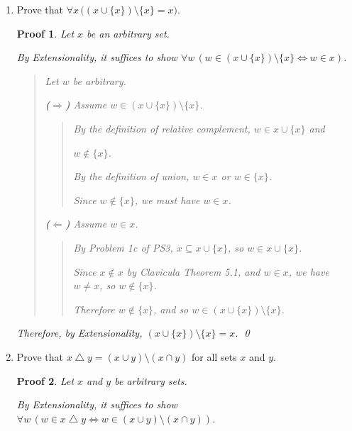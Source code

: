 \documentclass[12pt]{article}
\theoremstyle{proofstyle}
\newtheorem*{proof*}{Proof}
\begin{document}
\begin{enumerate}[left=0pt, itemsep=2em, parsep=1em]
\begin{enumerate}[label=(\alph*), itemsep=1.5em, leftmargin=2em]

\item Prove that $\forall x\,\bigl((x \cup \{x\}) \setminus \{x\} = x\bigr)$.

\begin{proof*}
    Let $x$ be an arbitrary set.

    By Extensionality, it suffices to show $\forall w\,(w \in (x \cup \{x\}) \setminus \{x\} \Leftrightarrow w \in x)$.

    \begin{quote}
        Let $w$ be arbitrary.

        \textbf{($\Rightarrow$)} Assume $w \in (x \cup \{x\}) \setminus \{x\}$.

        \begin{quote}
            By the definition of relative complement, $w \in x \cup \{x\}$ and 
            
            $w \notin \{x\}$.

            By the definition of union, $w \in x$ or $w \in \{x\}$.

            Since $w \notin \{x\}$, we must have $w \in x$.
        \end{quote}

        \textbf{($\Leftarrow$)} Assume $w \in x$.

        \begin{quote}
            By Problem 1c of PS3, $x \subseteq x \cup \{x\}$, so $w \in x \cup \{x\}$.

            Since $x \notin x$ by Clavicula Theorem 5.1, and $w \in x$, we have $w \neq x$, so $w \notin \{x\}$.
            
            Therefore $w \notin \{x\}$, and so $w \in (x \cup \{x\}) \setminus \{x\}$.
        \end{quote}
    \end{quote}

    Therefore, by Extensionality, $(x \cup \{x\}) \setminus \{x\} = x$. \qed
\end{proof*}

\item Prove that $x \mathbin{\triangle} y = (x \cup y) \setminus (x \cap y)$ for all sets $x$ and $y$.

\begin{proof*}
    Let $x$ and $y$ be arbitrary sets.

    By Extensionality, it suffices to show $\forall w\,(w \in x \mathbin{\triangle} y \Leftrightarrow w \in (x \cup y) \setminus (x \cap y))$.


\end{proof*}
\end{enumerate}
\end{enumerate}
\end{document}
